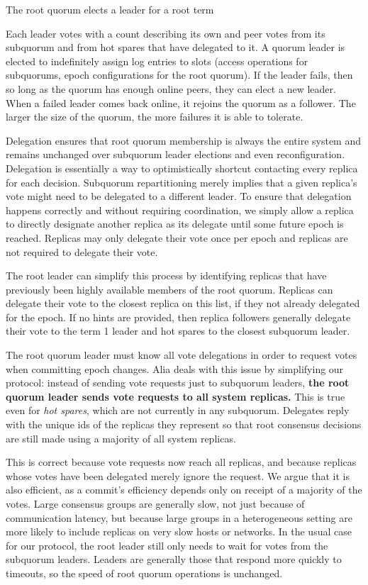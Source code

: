 \documentclass[10pt,conference]{IEEEtran}
\newcommand{\sys}{Alia\xspace}
\newcommand{\roo}{root quorum\xspace}
\begin{document}
The \roo elects a leader for a root term

Each leader votes with a count describing its own and peer votes from its
subquorum and from hot spares that have delegated to it.
A quorum leader is elected to indefinitely assign log entries to slots
(access operations for subquorums, epoch configurations for the root
quorum).
If the leader fails, then so long as the quorum has enough online peers,
they can elect a new leader.
When a failed leader comes back online, it rejoins the quorum as a
follower.
The larger the size of the quorum, the more failures it is able to
tolerate.

Delegation ensures that root quorum membership is always the entire
system and remains unchanged over subquorum leader elections and even
reconfiguration.
Delegation is essentially a way to optimistically shortcut contacting
every replica for each decision.
Subquorum repartitioning merely implies that a given replica's vote
might need to be delegated to a different leader.
To ensure that delegation happens correctly and without requiring
coordination, we simply allow a replica to directly designate another
replica as its delegate until some future epoch is reached.
Replicas may only delegate their vote once per epoch and replicas are
not required to delegate their vote.

The root leader can simplify this process by
 identifying
replicas that have previously been highly available members of the root quorum.
Replicas can delegate their vote to the closest replica on this list,
if they not already
delegated for the epoch.
If no hints are provided, then replica followers generally delegate
their vote to the term 1 leader and hot spares to the closest subquorum
leader.

The root quorum leader must
know all vote delegations in order to request votes when committing epoch
changes.
\sys deals with this issue by simplifying our protocol:
instead of sending vote requests just to subquorum leaders,
\textbf{the root quorum leader sends vote requests to all system
replicas.}
This is true even for \emph{hot spares}, which are not currently
in any subquorum.
Delegates reply with the
unique ids of the replicas they represent
so that root consensus decisions are still made using a majority of
all system replicas.

This is correct because vote requests now reach all replicas, and
because replicas whose votes have been delegated merely ignore the
request.
We argue that it is also efficient, as a commit's efficiency depends
only on receipt of a majority of the votes.
Large consensus groups are generally slow, not just because of
communication latency, but because large groups in a heterogeneous
setting are more likely to include replicas on very slow hosts or
networks.
In the usual case for our protocol, the root leader still only needs
to wait for votes from the subquorum leaders.
Leaders are generally those that respond more quickly to timeouts, so
the speed of root quorum operations is unchanged.
\end{document}

